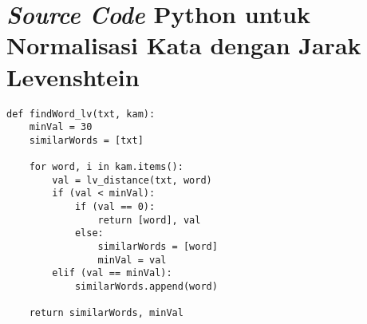\chapter{\textit{Source Code} Python untuk Normalisasi Kata dengan Jarak Levenshtein}

\begin{lstlisting}
def findWord_lv(txt, kam):
    minVal = 30
    similarWords = [txt]
    
    for word, i in kam.items():
        val = lv_distance(txt, word)
        if (val < minVal):
            if (val == 0):
                return [word], val
            else:
                similarWords = [word]
                minVal = val
        elif (val == minVal):
            similarWords.append(word)
            
    return similarWords, minVal
\end{lstlisting}